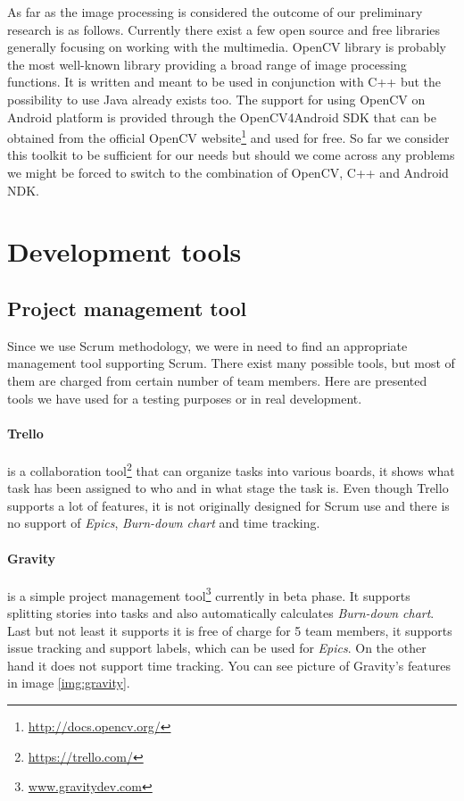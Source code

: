 As far as the image processing is considered the outcome of our preliminary research is as follows.
Currently there exist a few open source and free libraries generally focusing on working with the multimedia.
OpenCV library is probably the most well-known library providing a broad range of image processing functions.
It is written and meant to be used in conjunction with C++ but the possibility to use Java already exists too.
The support for using OpenCV on Android platform is provided through the OpenCV4Android SDK that can be obtained from the official OpenCV website\footnote{\url{http://docs.opencv.org/}} and used for free.
So far we consider this toolkit to be sufficient for our needs but should we come across any problems we might be forced to switch to the combination of OpenCV, C++ and Android NDK.


\section{Development tools} \label{txt:development tools}

\subsection{Project management tool}
Since we use Scrum methodology, we were in need to find an appropriate management tool supporting Scrum. 
There exist many possible tools, but most of them are charged from
certain number of team members. 
Here are presented tools we have used for a testing purposes or in real development.

\paragraph{Trello}
is a collaboration tool\footnote{\url{https://trello.com/}} that can organize tasks into various boards, it shows what task has been assigned to who and in what stage the task is.
Even though Trello supports a lot of features, it is not originally designed for Scrum use and there is no support of \emph{Epics}, \emph{Burn-down chart} and time tracking.

\paragraph{Gravity} 
is a simple project management tool\footnote{\url{www.gravitydev.com}} currently in beta phase.
It supports splitting stories into tasks and also automatically calculates \emph{Burn-down chart}. 
Last but not least it supports it is free of charge for 5 team members, it supports issue tracking and support labels, which can be used for \emph{Epics}.
On the other hand it does not support time tracking.
You can see picture of Gravity's features in image \ref{img:gravity}.

